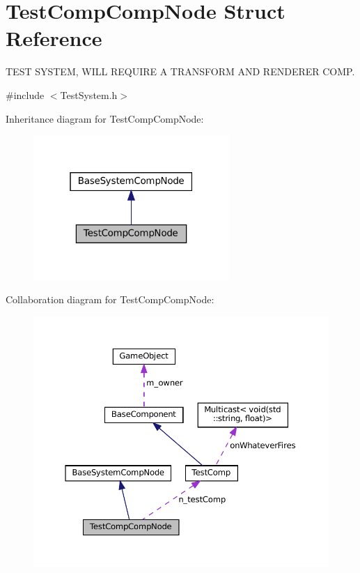 \hypertarget{structTestCompCompNode}{}\section{Test\+Comp\+Comp\+Node Struct Reference}
\label{structTestCompCompNode}


T\+E\+ST S\+Y\+S\+T\+EM, W\+I\+LL R\+E\+Q\+U\+I\+RE A T\+R\+A\+N\+S\+F\+O\+RM A\+ND R\+E\+N\+D\+E\+R\+ER C\+O\+MP.  




{\ttfamily \#include $<$Test\+System.\+h$>$}



Inheritance diagram for Test\+Comp\+Comp\+Node\+:\nopagebreak
\begin{figure}[H]
\begin{center}
\leavevmode
\includegraphics[width=211pt]{structTestCompCompNode__inherit__graph}
\end{center}
\end{figure}


Collaboration diagram for Test\+Comp\+Comp\+Node\+:\nopagebreak
\begin{figure}[H]
\begin{center}
\leavevmode
\includegraphics[width=350pt]{structTestCompCompNode__coll__graph}
\end{center}
\end{figure}
